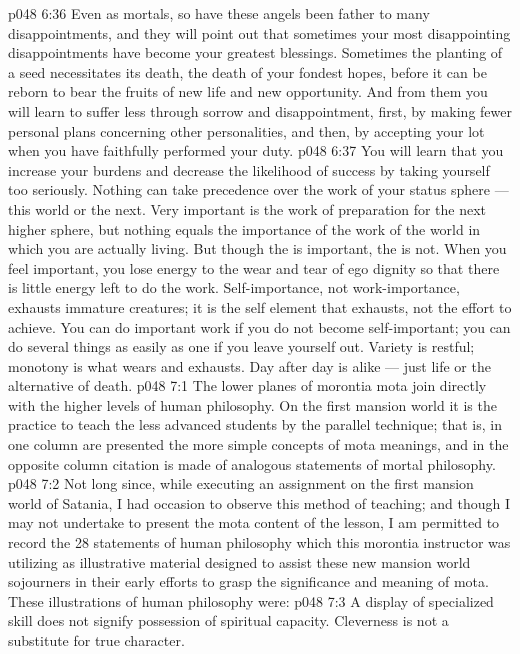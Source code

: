 \vs p048 6:36 Even as mortals, so have these angels been father to many disappointments, and they will point out that sometimes your most disappointing disappointments have become your greatest blessings. Sometimes the planting of a seed necessitates its death, the death of your fondest hopes, before it can be reborn to bear the fruits of new life and new opportunity. And from them you will learn to suffer less through sorrow and disappointment, first, by making fewer personal plans concerning other personalities, and then, by accepting your lot when you have faithfully performed your duty.
\vs p048 6:37 You will learn that you increase your burdens and decrease the likelihood of success by taking yourself too seriously. Nothing can take precedence over the work of your status sphere --- this world or the next. Very important is the work of preparation for the next higher sphere, but nothing equals the importance of the work of the world in which you are actually living. But though the  is important, the  is not. When you feel important, you lose energy to the wear and tear of ego dignity so that there is little energy left to do the work. Self\hyp{}importance, not work\hyp{}importance, exhausts immature creatures; it is the self element that exhausts, not the effort to achieve. You can do important work if you do not become self\hyp{}important; you can do several things as easily as one if you leave yourself out. Variety is restful; monotony is what wears and exhausts. Day after day is alike --- just life or the alternative of death.
\vs p048 7:1 The lower planes of morontia mota join directly with the higher levels of human philosophy. On the first mansion world it is the practice to teach the less advanced students by the parallel technique; that is, in one column are presented the more simple concepts of mota meanings, and in the opposite column citation is made of analogous statements of mortal philosophy.
\vs p048 7:2 Not long since, while executing an assignment on the first mansion world of Satania, I had occasion to observe this method of teaching; and though I may not undertake to present the mota content of the lesson, I am permitted to record the 28 statements of human philosophy which this morontia instructor was utilizing as illustrative material designed to assist these new mansion world sojourners in their early efforts to grasp the significance and meaning of mota. These illustrations of human philosophy were:
\vs p048 7:3 \bibnobreakspace A display of specialized skill does not signify possession of spiritual capacity. Cleverness is not a substitute for true character.
